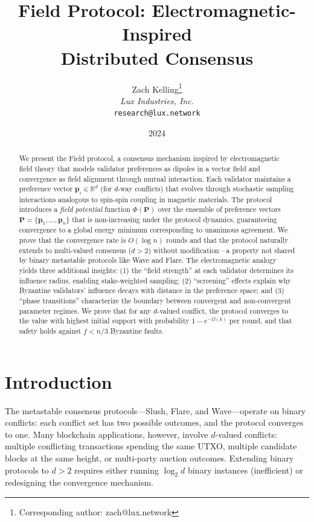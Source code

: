 \documentclass[11pt,a4paper]{article}
\title{\textbf{Field Protocol: Electromagnetic-Inspired\\Distributed Consensus}}
\author{
Zach Kelling\thanks{Corresponding author: zach@lux.network}\\
\textit{Lux Industries, Inc.}\\
\texttt{research@lux.network}
}
\date{2024}
\begin{document}
\luxcoverpage

\begin{abstract}
We present the Field protocol, a consensus mechanism inspired by electromagnetic field
theory that models validator preferences as dipoles in a vector field and convergence
as field alignment through mutual interaction. Each validator maintains a preference
vector $\mathbf{p}_i \in \mathbb{R}^d$ (for $d$-way conflicts) that evolves through
stochastic sampling interactions analogous to spin-spin coupling in magnetic materials.
The protocol introduces a \emph{field potential} function $\Phi(\mathbf{P})$ over the
ensemble of preference vectors $\mathbf{P} = \{\mathbf{p}_1, \ldots, \mathbf{p}_n\}$
that is non-increasing under the protocol dynamics, guaranteeing convergence to a
global energy minimum corresponding to unanimous agreement. We prove that the
convergence rate is $O(\log n)$ rounds and that the protocol naturally extends to
multi-valued consensus ($d > 2$) without modification---a property not shared by
binary metastable protocols like Wave and Flare. The electromagnetic analogy yields
three additional insights: (1) the ``field strength'' at each validator determines its
influence radius, enabling stake-weighted sampling; (2) ``screening'' effects explain
why Byzantine validators' influence decays with distance in the preference space; and
(3) ``phase transitions'' characterize the boundary between convergent and non-convergent
parameter regimes. We prove that for any $d$-valued conflict, the protocol converges
to the value with highest initial support with probability $1 - e^{-\Omega(k)}$ per
round, and that safety holds against $f < n/3$ Byzantine faults.
\end{abstract}

\tableofcontents
\newpage

\section{Introduction}
\label{sec:introduction}

The metastable consensus protocols---Slush, Flare, and Wave---operate on binary conflicts:
each conflict set has two possible outcomes, and the protocol converges to one. Many
blockchain applications, however, involve $d$-valued conflicts: multiple conflicting
transactions spending the same UTXO, multiple candidate blocks at the same height, or
multi-party auction outcomes. Extending binary protocols to $d > 2$ requires either
running $\log_2 d$ binary instances (inefficient) or redesigning the convergence mechanism.
\end{document}
